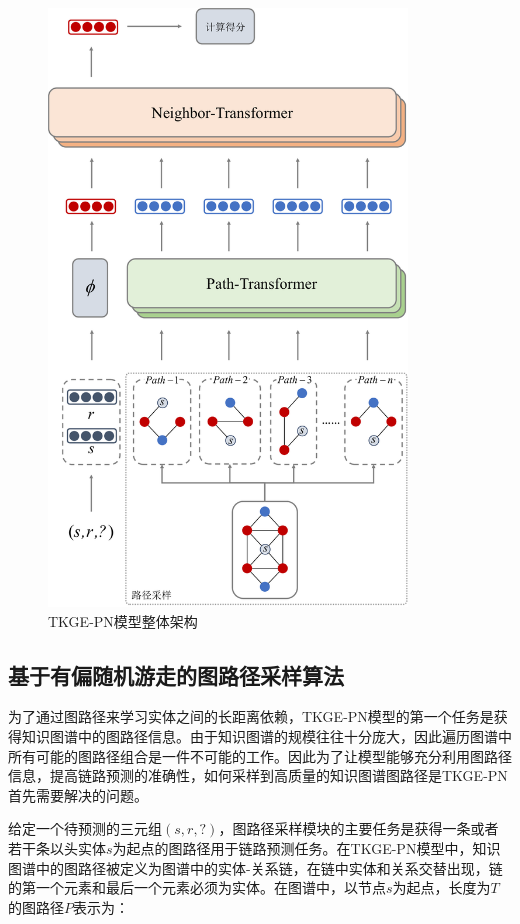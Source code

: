 \begin{figure}[htbp]
  \centerline{\includegraphics[width=0.85\textwidth]{pic/TKGE-PN_architecture.pdf}}
  \caption{TKGE-PN模型整体架构}
  \label{TKGE-PN_architecture}
\end{figure}

\subsection{基于有偏随机游走的图路径采样算法}

为了通过图路径来学习实体之间的长距离依赖，TKGE-PN模型的第一个任务是获得知识图谱中的图路径信息。由于知识图谱的规模往往十分庞大，因此遍历图谱中所有可能的图路径组合是一件不可能的工作。因此为了让模型能够充分利用图路径信息，提高链路预测的准确性，如何采样到高质量的知识图谱图路径是TKGE-PN首先需要解决的问题。

给定一个待预测的三元组$(s,r,?)$，图路径采样模块的主要任务是获得一条或者若干条以头实体$s$为起点的图路径用于链路预测任务。在TKGE-PN模型中，知识图谱中的图路径被定义为图谱中的实体-关系链，在链中实体和关系交替出现，链的第一个元素和最后一个元素必须为实体。在图谱中，以节点$s$为起点，长度为$T$的图路径$P$表示为：

